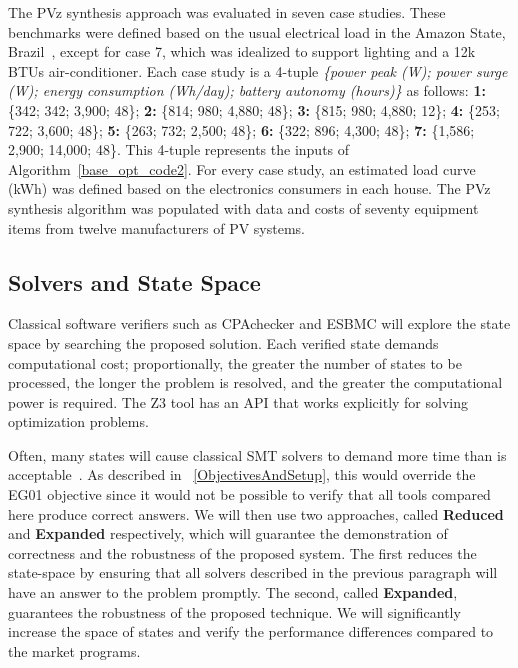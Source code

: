 \documentclass[review]{elsarticle}
\begin{document}
The PVz synthesis approach was evaluated in seven case studies. These benchmarks were defined based on the usual electrical load in the Amazon State, Brazil~\citep{TrindadeCordeiro19,Agrener2013}, except for case 7, which was idealized to support lighting and a 12k BTUs air-conditioner. 
Each case study is a 4-tuple \textit{\{power peak (W); power surge (W); energy consumption (Wh/day); battery autonomy (hours)\} } as follows:
  \textbf{1:} \{342; 342; 3,900; 48\}; \textbf{2:} \{814; 980; 4,880; 48\}; \textbf{3:} \{815; 980; 4,880; 12\}; \textbf{4:} \{253; 722; 3,600; 48\}; \textbf{5:} \{263; 732; 2,500; 48\}; \textbf{6:} \{322; 896; 4,300; 48\}; \textbf{7:} \{1,586; 2,900; 14,000; 48\}. This 4-tuple represents the inputs of Algorithm~\ref{base_opt_code2}. For every case study, an estimated load curve (kWh) was defined based on the electronics consumers in each house. The PVz synthesis algorithm was populated with data and costs of seventy equipment items from twelve manufacturers of PV systems. 

\subsection{Solvers and State Space}
\label{sec:SolversandStateSpace}
Classical software verifiers such as CPAchecker and ESBMC will explore the state space by searching the proposed solution. Each verified state demands computational cost; proportionally, the greater the number of states to be processed, the longer the problem is resolved, and the greater the computational power is required. The Z3 tool has an API that works explicitly for solving optimization problems.

Often, many states will cause classical SMT solvers to demand more time than is acceptable~\citep{abs-1909-13139}. As described in ~\ref{ObjectivesAndSetup}, this would override the EG01 objective since it would not be possible to verify that all tools compared here produce correct answers. We will then use two approaches, called \textbf{Reduced} and \textbf{Expanded} respectively, which will guarantee the demonstration of correctness and the robustness of the proposed system. The first reduces the state-space by ensuring that all solvers described in the previous paragraph will have an answer to the problem promptly. The second, called \textbf{Expanded}, guarantees the robustness of the proposed technique. We will significantly increase the space of states and verify the performance differences compared to the market programs. 
\end{document}
